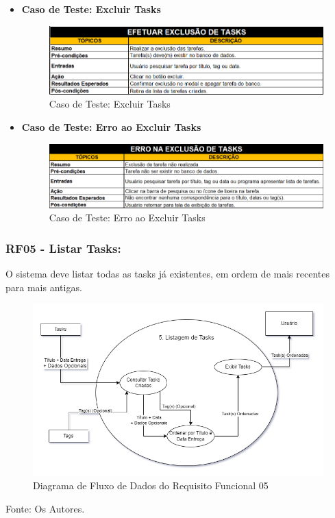 \documentclass[a4paper,12pt]{article}
\begin{document}
\pagebreak
\begin{itemize}
	\item\textbf{Caso de Teste: Excluir Tasks}
	\begin{figure}[H]
		\centering
		\includegraphics[scale=0.75]{UnitTest/trueCase/deleteTask.png}
		\caption{Caso de Teste: Excluir Tasks}
	\end{figure}
	\item\textbf{Caso de Teste: Erro ao Excluir Tasks}
	\begin{figure}[H]
		\centering
		\includegraphics[scale=0.75]{UnitTest/falseCase/deleteTask.png}
		\caption{Caso de Teste: Erro ao Excluir Tasks}
	\end{figure}
\end{itemize}

\pagebreak
\subsubsection{RF05 - Listar Tasks:}
O sistema deve listar todas as tasks já existentes, em ordem de mais recentes para mais antigas.
\begin{figure}[H]
	\centering
	\includegraphics[scale=0.45]{DFDs/RF05.drawio.png}
	\caption{Diagrama de Fluxo de Dados do Requisito Funcional 05}
\end{figure}
\noindent Fonte: Os Autores.
\end{document}
